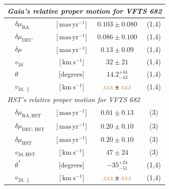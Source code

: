 \documentclass[apjl,twocolumn]{emulateapj}
\newcommand{\SdM}[1]{{{\color{brown}{#1}}}}
\newcommand{\kms}{{\,\mathrm{km\ s^{-1}}}}
\newcommand{\masyr}{\,\mathrm{mas}\,\mathrm{yr}^{-1}}
\begin{document}
\begin{table}
\begin{center}
\begin{tabular}{llc|c|c}
                


      \multicolumn{5}{l}{\emph{Gaia's relative proper motion for VFTS
      682 }} \\
      \hline
      &$\delta\mu_\mathrm{RA}$  &[$\masyr$] & $0.103\pm0.080$ & (1,4) \\
      &$\delta\mu_\mathrm{DEC}$  &[$\masyr$] & $0.086\pm0.100$ &  (1,4) \\
      &$\delta\mu_\mathrm{}$  &[$\masyr$] & $0.13\pm0.09$ &  (1,4) \\
                 &$v_\mathrm{2d}$  &[$\kms$] & $32\pm21$ & (1,4)\\  
                     &$\theta$  &[degrees] &  $14.2_{-43}^{+44}$  & (1,4)\\  
                         &$v_\mathrm{2d, \parallel}$  &[$\kms$] & $\SdM{xxx}\pm\SdM{xxx}$ & (1,4)\\  

 \hline     
          \multicolumn{5}{l}{\emph{HST's relative proper motion for VFTS 682}} \\
            \hline
      &$\delta\mu_\mathrm{RA, HST}$  &[$\masyr$] & $0.01\pm0.13$ & (3) \\
      &$\delta\mu_\mathrm{DEC, HST}$  &[$\masyr$] & $0.20\pm0.10$ &  (3) \\
       &$\delta\mu_\mathrm{HST}$  &[$\masyr$] & $0.20\pm0.10$ &  (3) \\
                  &$v_\mathrm{2d, HST}$  &[$\kms$] & $47\pm24$ & (3)\\  
                      &$\theta^{*}$  &[degrees] &   $-35_{-51}^{+24}$   & (1,4)\\  
                          &$v_\mathrm{2d, \parallel}$  &[$\kms$] & $\SdM{xxx}\pm\SdM{xxx}$ & (1,4)\\  

     
\hline



\end{tabular}
\end{center}
\end{table}
\end{document}
